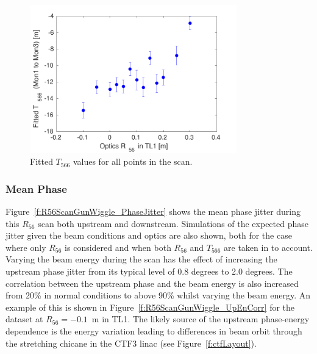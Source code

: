 \begin{figure}
  \centering
  \includegraphics[width=0.8\textwidth]{Figures/propagation/R56ScanGunWiggle_T566Fit}
  \caption{Fitted \(T_{566}\) values for all points in the scan.}
  \label{f:R56ScanGunWiggle_T566Fit}
\end{figure}


\subsubsection{Mean Phase}

Figure~\ref{f:R56ScanGunWiggle_PhaseJitter} shows the mean phase jitter during this \(R_{56}\) scan both upstream and downstream. Simulations of the expected phase jitter given the beam conditions and optics are also shown, both for the case where only \(R_{56}\) is considered and when both \(R_{56}\) and \(T_{566}\) are taken in to account. Varying the beam energy during the scan has the effect of increasing the upstream phase jitter from its typical level of 0.8 degrees to 2.0 degrees. The correlation between the upstream phase and the beam energy is also increased from 20\% in normal conditions to above 90\% whilst varying the beam energy. An example of this is shown in Figure~\ref{f:R56ScanGunWiggle_UpEnCorr} for the dataset at \(R_{56}=-0.1\)~m in TL1. The likely source of the upstream phase-energy dependence is the energy variation leading to differences in beam orbit through the stretching chicane in the CTF3 linac (see Figure~\ref{f:ctfLayout}).

